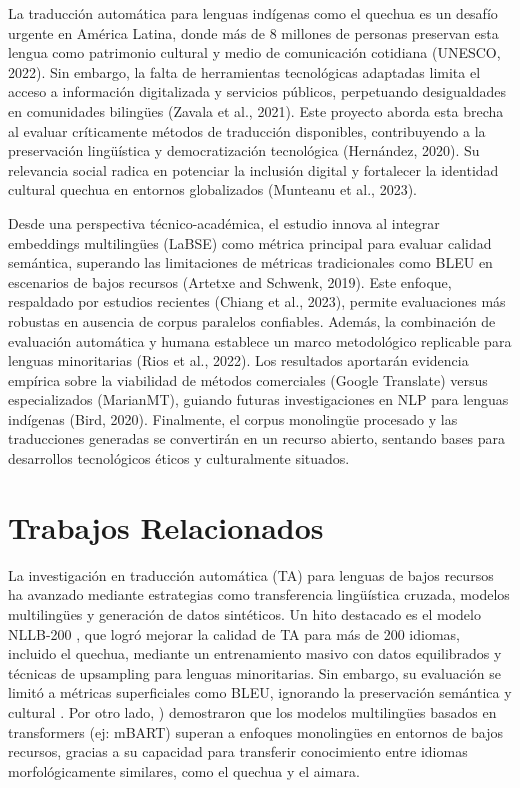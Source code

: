La traducción automática para lenguas indígenas como el quechua es un desafío urgente en América Latina, donde más de 8 millones de personas preservan esta lengua como patrimonio cultural y medio de comunicación cotidiana (UNESCO, 2022). Sin embargo, la falta de herramientas tecnológicas adaptadas limita el acceso a información digitalizada y servicios públicos, perpetuando desigualdades en comunidades bilingües (Zavala et al., 2021). Este proyecto aborda esta brecha al evaluar críticamente métodos de traducción disponibles, contribuyendo a la preservación lingüística y democratización tecnológica (Hernández, 2020). Su relevancia social radica en potenciar la inclusión digital y fortalecer la identidad cultural quechua en entornos globalizados (Munteanu et al., 2023).

Desde una perspectiva técnico-académica, el estudio innova al integrar embeddings multilingües (LaBSE) como métrica principal para evaluar calidad semántica, superando las limitaciones de métricas tradicionales como BLEU en escenarios de bajos recursos (Artetxe and Schwenk, 2019). Este enfoque, respaldado por estudios recientes (Chiang et al., 2023), permite evaluaciones más robustas en ausencia de corpus paralelos confiables. Además, la combinación de evaluación automática y humana establece un marco metodológico replicable para lenguas minoritarias (Rios et al., 2022). Los resultados aportarán evidencia empírica sobre la viabilidad de métodos comerciales (Google Translate) versus especializados (MarianMT), guiando futuras investigaciones en NLP para lenguas indígenas (Bird, 2020). Finalmente, el corpus monolingüe procesado y las traducciones generadas se convertirán en un recurso abierto, sentando bases para desarrollos tecnológicos éticos y culturalmente situados.

\section{Trabajos Relacionados}
La investigación en traducción automática (TA) para lenguas de bajos recursos ha avanzado mediante estrategias como transferencia lingüística cruzada, modelos multilingües y generación de datos sintéticos. Un hito destacado es el modelo NLLB-200 \cite{team2022no}, que logró mejorar la calidad de TA para más de 200 idiomas, incluido el quechua, mediante un entrenamiento masivo con datos equilibrados y técnicas de upsampling para lenguas minoritarias. Sin embargo, su evaluación se limitó a métricas superficiales como BLEU, ignorando la preservación semántica y cultural \cite{faisal2024dialectbench}. Por otro lado, \cite{lauscher2020zero}) demostraron que los modelos multilingües basados en transformers (ej: mBART) superan a enfoques monolingües en entornos de bajos recursos, gracias a su capacidad para transferir conocimiento entre idiomas morfológicamente similares, como el quechua y el aimara.

